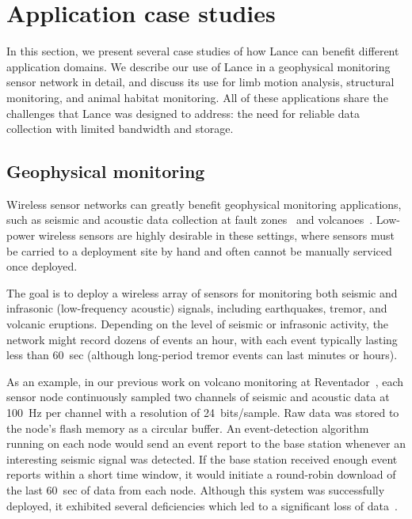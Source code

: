 \section{Application case studies}
\label{lance-sec-applications}
\label{lance-sec-casestudy}

In this section, we present several case studies of how Lance can
benefit different application domains. We describe our use of Lance in
a geophysical monitoring sensor network in detail, and discuss its use for
limb motion analysis, structural monitoring, and animal habitat
monitoring. All of these applications share the challenges that Lance was 
designed to address: the need for reliable data collection with 
limited bandwidth and storage. 

\subsection{Geophysical monitoring}

Wireless sensor networks can greatly benefit geophysical monitoring
applications, such as seismic and acoustic data collection at fault
zones~\cite{ucla-seismic} and volcanoes~\cite{volcano-osdi06}. Low-power
wireless sensors are highly desirable in these settings, where sensors must
be carried to a deployment site by hand and often cannot be manually serviced
once deployed. 

The goal is to deploy a wireless array of sensors for 
monitoring both seismic and infrasonic (low-frequency acoustic)
signals, including earthquakes, tremor, and volcanic eruptions. 
Depending on the level of seismic or infrasonic activity, the network 
might record dozens of events an hour, with each event typically lasting 
less than 60~sec (although long-period tremor events can last minutes 
or hours). 

As an example, in our previous work on volcano monitoring at
Reventador~\cite{volcano-osdi06}, each sensor node continuously sampled two
channels of seismic and acoustic data at 100~Hz per channel with a resolution
of 24~bits/sample. Raw data was stored to the node's flash memory as a
circular buffer.  An event-detection algorithm running on each node would
send an event report to the base station whenever an interesting seismic
signal was detected. If the base station received enough event reports within
a short time window, it would initiate a round-robin download of the last
60~sec of data from each node.  Although this system was successfully
deployed, it exhibited several deficiencies which led to a significant loss
of data~\cite{volcano-osdi06}. 

